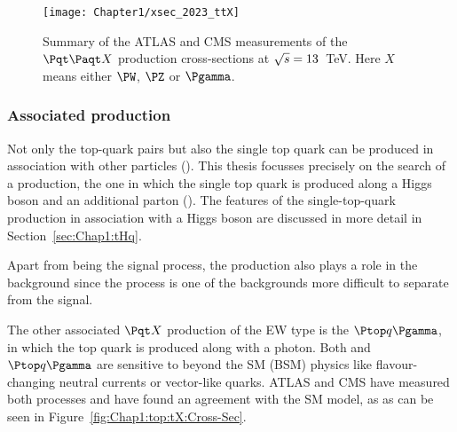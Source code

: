\begin{figure}[h]
    \centering
    \texttt{[image: Chapter1/xsec\_2023\_ttX]}
    \caption{Summary of the ATLAS and CMS measurements of the $\ttbar X$ production 
    cross-sections at $\sqrt{s} =13$~TeV. Here $X$ means either $\PW$, $\PZ$ or $\Pgamma$.} %
    \label{fig:Chap1:top:ttX:Cross-Sec}
\end{figure}

\subsubsection{Associated \tX production}
\label{sec:Chap1:Top:Production:top_plus_X}
Not only the top-quark pairs but also the single top quark can be produced
in association with other particles (\tX).
This thesis focusses precisely on the search of a \tX production, the
one in which the single top quark is produced along a Higgs boson and
an additional parton (\tHq). The features of the single-top-quark production 
in association with a Higgs boson are discussed in more detail in 
Section~\ref{sec:Chap1:tHq}.

Apart from being the signal process, the \tX production also plays a role
in the background since the \tZq process
is one of the backgrounds more difficult to separate from the \tHq signal. 

The other associated $\tX$ production of the EW type is the $\Ptop q \Pgamma$, in which the
top quark is produced along with a photon. Both \tZq and $\Ptop q \Pgamma$
are sensitive to beyond the SM (BSM) physics like flavour-changing neutral currents or vector-like quarks.
ATLAS and CMS have measured both processes and have found an agreement with the SM model, as 
as can be seen in  Figure~\ref{fig:Chap1:top:tX:Cross-Sec}.


